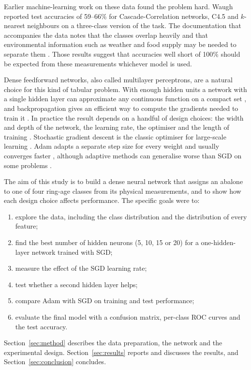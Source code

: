 \documentclass[conference]{IEEEtran}
\begin{document}
Earlier machine-learning work on these data found the problem hard. Waugh \cite{waugh1995} reported test accuracies of 59--66\% for Cascade-Correlation networks, C4.5 and $k$-nearest neighbours on a three-class version of the task. The documentation that accompanies the data notes that the classes overlap heavily and that environmental information such as weather and food supply may be needed to separate them \cite{uci}. Those results suggest that accuracies well short of 100\% should be expected from these measurements whichever model is used.

Dense feedforward networks, also called multilayer perceptrons, are a natural choice for this kind of tabular problem. With enough hidden units a network with a single hidden layer can approximate any continuous function on a compact set \cite{cybenko1989,hornik1989}, and backpropagation gives an efficient way to compute the gradients needed to train it \cite{rumelhart1986}. In practice the result depends on a handful of design choices: the width and depth of the network, the learning rate, the optimiser and the length of training \cite{bengio2012,goodfellow2016}. Stochastic gradient descent is the classic optimiser for large-scale learning \cite{bottou2010}. Adam adapts a separate step size for every weight and usually converges faster \cite{kingma2015}, although adaptive methods can generalise worse than SGD on some problems \cite{wilson2017}.

The aim of this study is to build a dense neural network that assigns an abalone to one of four ring-age classes from its physical measurements, and to show how each design choice affects performance. The specific goals were to:
\begin{enumerate}
\item explore the data, including the class distribution and the distribution of every feature;
\item find the best number of hidden neurons (5, 10, 15 or 20) for a one-hidden-layer network trained with SGD;
\item measure the effect of the SGD learning rate;
\item test whether a second hidden layer helps;
\item compare Adam with SGD on training and test performance;
\item evaluate the final model with a confusion matrix, per-class ROC curves and the test accuracy.
\end{enumerate}

Section~\ref{sec:method} describes the data preparation, the network and the experimental design. Section~\ref{sec:results} reports and discusses the results, and Section~\ref{sec:conclusion} concludes.
\end{document}
